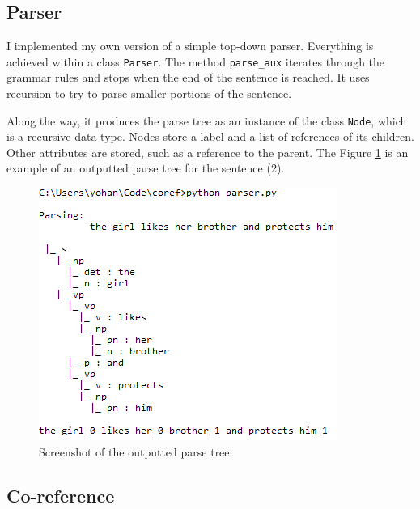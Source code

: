 \documentclass[a4paper]{article}
\theoremstyle{definition}
\begin{document}
\subsection{Parser}

I implemented my own version of a simple top-down parser. Everything is achieved within a class \texttt{Parser}. The method \texttt{parse\_aux} iterates through the grammar rules and stops when the end of the sentence is reached. It uses recursion to try to parse smaller portions of the sentence.

Along the way, it produces the parse tree as an instance of the class \texttt{Node}, which is a recursive data type. Nodes store a label and a list of references of its children. Other attributes are stored, such as a reference to the parent. The Figure \ref{fig:screenshot} is an example of an outputted parse tree for the sentence (2).

\begin{figure}
\centering
\includegraphics[scale=.8]{screenshot_parse_tree}
\caption{Screenshot of the outputted parse tree\label{fig:screenshot}}
\end{figure}

\subsection{Co-reference}
\end{document}
